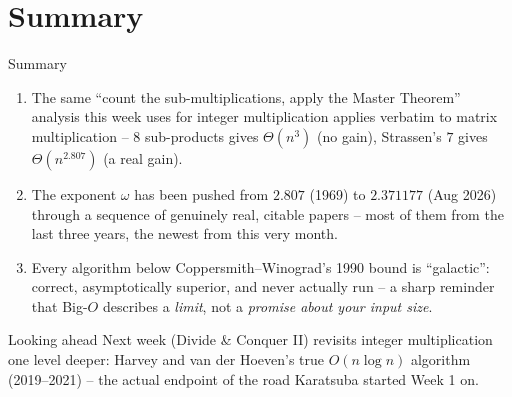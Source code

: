 \documentclass[11pt,aspectratio=169]{beamer}
\begin{document}
\section{Summary}

\begin{frame}{Summary}
  \footnotesize
  \begin{enumerate}
    \item The same ``count the sub-multiplications, apply the Master Theorem'' analysis
    this week uses for integer multiplication applies verbatim to matrix multiplication --
    $8$ sub-products gives $\Theta(n^3)$ (no gain), Strassen's $7$ gives
    $\Theta(n^{2.807})$ (a real gain).
    \item The exponent $\omega$ has been pushed from $2.807$ (1969) to $2.371177$ (Aug
    2026) through a sequence of genuinely real, citable papers -- most of them from the
    last three years, the newest from this very month.
    \item Every algorithm below Coppersmith--Winograd's 1990 bound is ``galactic'': correct,
    asymptotically superior, and never actually run -- a sharp reminder that Big-$O$
    describes a \emph{limit}, not a \emph{promise about your input size}.
  \end{enumerate}
  \begin{alertblock}{Looking ahead}
    Next week (Divide \& Conquer II) revisits integer multiplication one level deeper:
    Harvey and van der Hoeven's true $O(n \log n)$ algorithm (2019--2021) -- the actual
    endpoint of the road Karatsuba started Week 1 on.
  \end{alertblock}
\end{frame}
\end{document}

